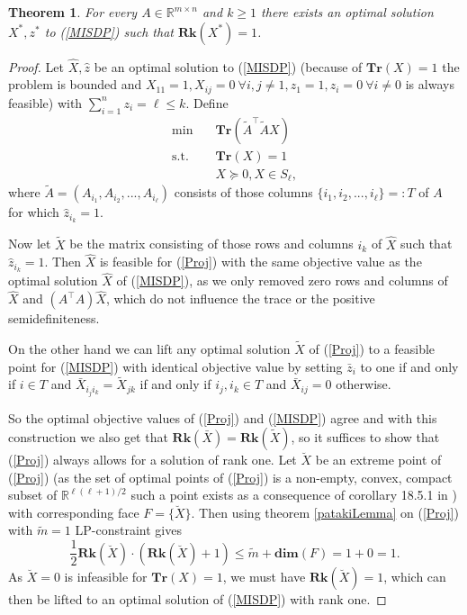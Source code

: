 \documentclass{elsarticle}
\newtheorem{thm}{Theorem}
\newcommand{\T}{^{\top}}
\newcommand{\R}{\mathds{R}}
\begin{document}
\begin{thm}\label{Rk1thm}
 For every $A \in \R^{m \times n}$ and $k \geq 1$ there exists an optimal solution $X^*, z^*$ to (\ref{MISDP}) such that $\textbf{Rk}(X^*) = 1$. 
\end{thm}
\begin{proof}
 Let $\hat{X}, \hat{z}$ be an optimal solution to (\ref{MISDP}) (because of $\textbf{Tr}(X) = 1$ the problem is bounded and $X_{11} = 1, X_{ij} = 0 \ \forall i,j \neq 1, z_1 = 1, z_i = 0 \ \forall i \neq 0$ is always feasible)
 with $\sum_{i=1}^n z_i = \ell \leq k$. Define
 \begin{align}\label{Proj}
 \text{min} \quad & \textbf{Tr}(\tilde{A}\T\tilde{A}X) \nonumber \\
 \text{s.t.} \quad & \textbf{Tr}(X) = 1 \tag{Proj} \\
 & X \succeq 0 , X \in S_\ell, \nonumber
 \end{align}
where $\tilde{A} = (A_{i_1}, A_{i_2}, ..., A_{i_\ell})$ consists of those
columns $\{{i_1}, {i_2}, ..., {i_\ell}\} =: T$ of $A$ for which
$\hat{z}_{i_k} = 1$.

Now let $\tilde{X}$ be the matrix consisting of those rows and columns 
$i_k$ of $\hat{X}$ such that $\hat{z}_{i_k} = 1$. Then $\hat{X}$ is feasible for (\ref{Proj}) with the same objective value as the optimal solution $\hat{X}$ of (\ref{MISDP}), as we only removed zero rows and columns of $\hat{X}$ 
and $(A\T A)\hat{X}$, which do not influence the trace or the positive
semidefiniteness.

On the other hand we can lift any optimal solution $\tilde{X}$ of (\ref{Proj}) to a feasible point for (\ref{MISDP}) with identical objective value by setting $\bar{z}_i$ to one if and only if $i \in T$
and $\bar{X}_{i_j i_k} = \tilde{X}_{jk}$ if and only if $i_j, i_k \in T$
and $\bar{X}_{ij}=0$ otherwise.

So the optimal objective values of (\ref{Proj}) and (\ref{MISDP}) agree and with this construction we also get that 
$\textbf{Rk}(\bar{X}) = \textbf{Rk}(\tilde{X})$, so it suffices to show that (\ref{Proj}) always allows for a solution of rank one.
Let $\breve{X}$ be an extreme point of (\ref{Proj}) (as the set of optimal points of (\ref{Proj}) is a non-empty, convex, compact subset of $\R^{\ell(\ell+1)/2}$ such a point exists as a consequence of corollary 18.5.1 in
\cite{Roc70}) with corresponding face $F=\{\breve{X}\}$. Then using theorem \ref{patakiLemma} on (\ref{Proj}) with $\tilde{m} = 1$ LP-constraint gives
\begin{equation*}
 \frac{1}{2}\textbf{Rk}(\breve{X})\cdot(\textbf{Rk}(\breve{X})+1) \leq \tilde{m} + \textbf{dim}(F) = 1 + 0 = 1.
\end{equation*}
As $\breve{X}=0$ is infeasible for $\textbf{Tr}(X)=1$, we must have $\textbf{Rk}(\breve{X}) = 1$, which can then be lifted to an optimal solution of (\ref{MISDP}) with rank one.
\end{proof}
\end{document}
